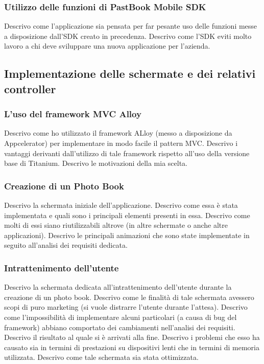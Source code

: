 			\subsubsection{Utilizzo delle funzioni di PastBook Mobile SDK}
				Descrivo come l'applicazione sia pensata per far pesante uso delle funzioni messe a disposizione dall'SDK creato in
				precedenza. Descrivo come l'SDK eviti molto lavoro a chi deve sviluppare una nuova applicazione per l'azienda.
		\subsection{Implementazione delle schermate e dei relativi controller}
			\subsubsection{L'uso del framework MVC Alloy}
				Descrivo come ho utilizzato il framework ALloy (messo a disposizione da Appcelerator) per implementare in modo
				facile il pattern MVC. Descrivo i vantaggi derivanti dall'utilizzo di tale framework rispetto all'uso della versione
				base di Titanium. Descrivo le motivazioni della mia scelta.
			\subsubsection{Creazione di un Photo Book}
				Descrivo la schermata iniziale dell'applicazione. Descrivo come essa è stata implementata e quali sono i principali
				elementi presenti in essa. Descrivo come molti di essi siano riutilizzabili altrove (in altre schermate o anche
				altre applicazioni). Descrivo le principali animazioni che sono state implementate in seguito all'analisi dei
				requisiti dedicata.
			\subsubsection{Intrattenimento dell'utente}
				Descrivo la schermata dedicata all'intrattenimento dell'utente durante la creazione di un photo book. Descrivo come
				le finalità di tale schermata avessero scopi di puro marketing (si vuole distrarre l'utente durante l'attesa).
				Descrivo come l'impossibilità di implementare alcuni particolari (a causa di bug del framework) abbiano comportato
				dei cambiamenti nell'analisi dei requisiti. Descrivo il risultato al quale si è arrivati alla fine. Descrivo i
				problemi che esso ha causato sia in termini di prestazioni su dispositivi lenti che in termini di memoria utilizzata.
				Descrivo come tale schermata sia stata ottimizzata.
